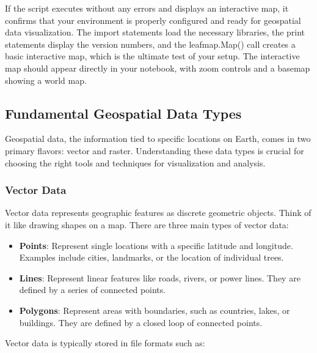 If the script executes without any errors and displays an interactive map, it confirms that your environment is properly configured and ready for geospatial data visualization. The import statements load the necessary libraries, the print statements display the version numbers, and the leafmap.Map() call creates a basic interactive map, which is the ultimate test of your setup. The interactive map should appear directly in your notebook, with zoom controls and a basemap showing a world map.

\subsection{Fundamental Geospatial Data Types}

Geospatial data, the information tied to specific locations on Earth, comes in two primary flavors: vector and raster. Understanding these data types is crucial for choosing the right tools and techniques for visualization and analysis.

\subsubsection{Vector Data}

Vector data represents geographic features as discrete geometric objects. Think of it like drawing shapes on a map. There are three main types of vector data:

\begin{itemize}
\item \textbf{Points}: Represent single locations with a specific latitude and longitude. Examples include cities, landmarks, or the location of individual trees.
\item \textbf{Lines}: Represent linear features like roads, rivers, or power lines. They are defined by a series of connected points.
\item \textbf{Polygons}: Represent areas with boundaries, such as countries, lakes, or buildings. They are defined by a closed loop of connected points.
\end{itemize}

Vector data is typically stored in file formats such as:

